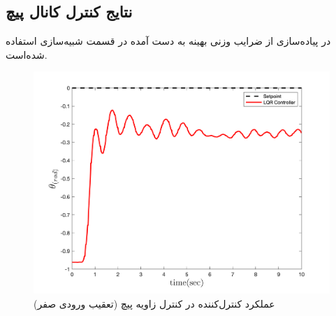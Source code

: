 \documentclass{CCI2020}
\begin{document}
	\subsection{نتایج کنترل کانال پیچ}\label{roll_lqr_section}
	در پیاده‌سازی از ضرایب وزنی بهینه به دست آمده در قسمت شبیه‌سازی استفاده شده‌است.
	\begin{figure}[H]
		\includegraphics[width=.48\linewidth]{../Figures/Calibration/LQR/Pitch/lqr_pitch.png}
		\centering
		\caption{عملكرد کنترل‌کننده  در کنترل زاويه پیچ (تعقیب ورودی صفر)}
	\end{figure}
\end{document}
